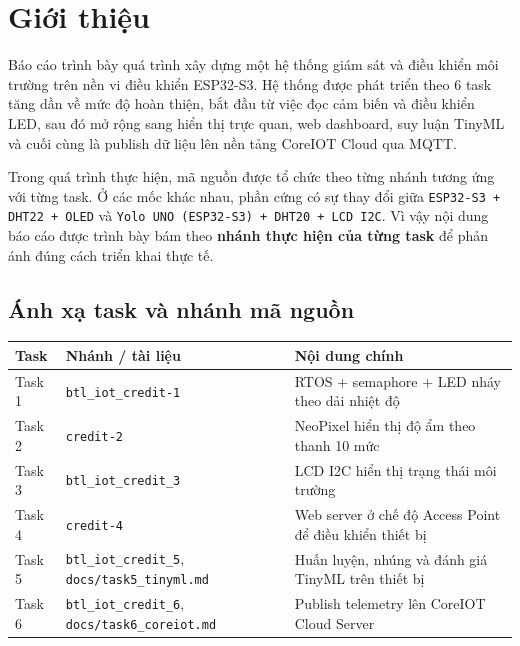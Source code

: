 \documentclass[12pt,a4paper]{article}
\begin{document}
\clearpage
\hypersetup{pageanchor=true}
\tableofcontents
\newpage

\section{Giới thiệu}

Báo cáo trình bày quá trình xây dựng một hệ thống giám sát và điều khiển môi trường trên nền vi điều khiển ESP32-S3. Hệ thống được phát triển theo 6 task tăng dần về mức độ hoàn thiện, bắt đầu từ việc đọc cảm biến và điều khiển LED, sau đó mở rộng sang hiển thị trực quan, web dashboard, suy luận TinyML và cuối cùng là publish dữ liệu lên nền tảng CoreIOT Cloud qua MQTT.

Trong quá trình thực hiện, mã nguồn được tổ chức theo từng nhánh tương ứng với từng task. Ở các mốc khác nhau, phần cứng có sự thay đổi giữa \texttt{ESP32-S3 + DHT22 + OLED} và \texttt{Yolo UNO (ESP32-S3) + DHT20 + LCD I2C}. Vì vậy nội dung báo cáo được trình bày bám theo \textbf{nhánh thực hiện của từng task} để phản ánh đúng cách triển khai thực tế.

\subsection{Ánh xạ task và nhánh mã nguồn}

\begin{table}[H]
\centering
\begin{tabular}{>{\raggedright\arraybackslash}p{} >{\raggedright\arraybackslash}p{} >{\raggedright\arraybackslash}p{}}
\toprule
\textbf{Task} & \textbf{Nhánh / tài liệu} & \textbf{Nội dung chính} \\
\midrule
Task 1 & \texttt{btl\_iot\_credit-1} & RTOS + semaphore + LED nháy theo dải nhiệt độ \\
Task 2 & \texttt{credit-2} & NeoPixel hiển thị độ ẩm theo thanh 10 mức \\
Task 3 & \texttt{btl\_iot\_credit\_3} & LCD I2C hiển thị trạng thái môi trường \\
Task 4 & \texttt{credit-4} & Web server ở chế độ Access Point để điều khiển thiết bị \\
Task 5 & \texttt{btl\_iot\_credit\_5}, \texttt{docs/task5\_tinyml.md} & Huấn luyện, nhúng và đánh giá TinyML trên thiết bị \\
Task 6 & \texttt{btl\_iot\_credit\_6}, \texttt{docs/task6\_coreiot.md} & Publish telemetry lên CoreIOT Cloud Server \\
\bottomrule
\end{tabular}
\end{table}
\end{document}
